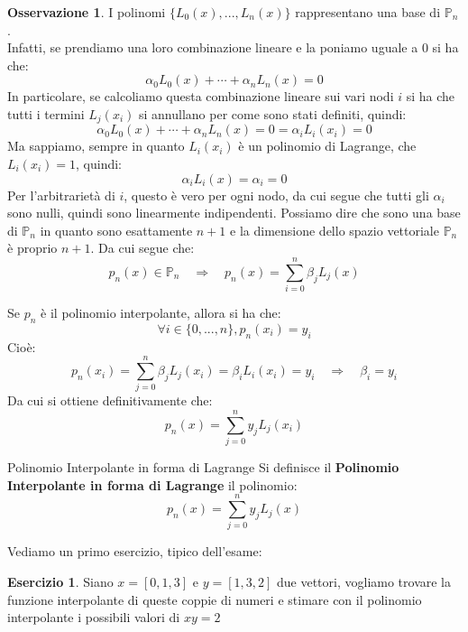 \documentclass[11pt,a4paper,twoside]{article}
\theoremstyle{definition}
\newtheorem*{oss}{Osservazione}
\newtheorem*{ese}{Esercizio}
\begin{document}
\begin{oss}
	I polinomi $\{L_0(x),...,L_n(x)\}$ rappresentano una base di $\mathbb P_n$.\\
	Infatti, se prendiamo una loro combinazione lineare e la poniamo uguale a $0$ si ha che:
	\[ \alpha_0 L_0(x) + \cdots + \alpha_n L_n(x) = 0 \]
	In particolare, se calcoliamo questa combinazione lineare sui vari nodi $i$ si ha che tutti i termini $L_j(x_i)$  si annullano per come sono stati definiti, quindi:
	\[ \alpha_0 L_0(x) + \cdots + \alpha_n L_n(x) = 0  = \alpha_i L_i(x_i) = 0\]
	Ma sappiamo, sempre in quanto $L_i(x_i)$ è un polinomio di Lagrange, che $L_i(x_i)=1$, quindi:
	\[ \alpha_i L_i(x) = \alpha_i = 0 \]
	Per l'arbitrarietà di $i$, questo è vero per ogni nodo, da cui segue che tutti gli $\alpha_i$ sono nulli, quindi sono linearmente indipendenti. Possiamo dire che sono una base di $\mathbb P_n$ in quanto sono esattamente $n+1$ e la dimensione dello spazio vettoriale $\mathbb P_n$ è proprio $n+1$. Da cui segue che:
	\[p_n(x) \in \mathbb P_n \quad \Rightarrow \quad p_n(x) = \sum_{i = 0}^n \beta_jL_j(x)\]
\end{oss}

Se $p_n$ è il polinomio interpolante, allora si ha che:
\[\forall i \in \{0,...,n\}, p_n(x_i) = y_i\]
Cioè:
\[ p_n(x_i) = \sum_{j = 0}^n \beta_jL_j(x_i) = \beta_iL_i(x_i) = y_i \quad \Rightarrow \quad \beta_i = y_i \]
Da cui si ottiene definitivamente che:
\[ p_n(x) = \sum_{j = 0}^n y_jL_j(x_i) \]

\begin{defn}{Polinomio Interpolante in forma di Lagrange}{}
	Si definisce il \textbf{Polinomio Interpolante in forma di Lagrange} il polinomio:
	\[ p_n(x) = \sum_{j = 0}^n y_jL_j(x) \]
\end{defn}

Vediamo un primo esercizio, tipico dell'esame:

\begin{ese}
	Siano $x = [0,1,3]$ e $y = [1,3,2]$ due vettori, vogliamo trovare la funzione interpolante di queste coppie di numeri e stimare con il polinomio interpolante i possibili valori di $xy = 2$
\end{ese}
\end{document}
